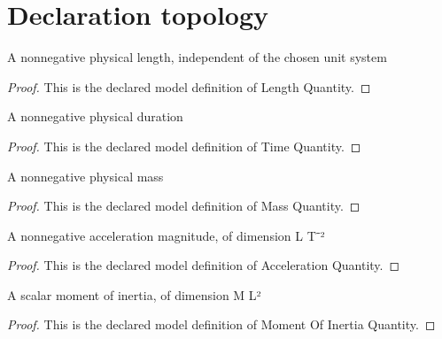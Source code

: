 \section{Declaration topology}
\begin{definition}
  \label{def:physics:phyx-mini-0282:phyxminiproblems-problemphyxmini0282-lengthquantity}
  A nonnegative physical length, independent of the chosen unit system
\end{definition}
\begin{proof}
  This is the declared model definition of Length Quantity.
\end{proof}
\begin{definition}
  \label{def:physics:phyx-mini-0282:phyxminiproblems-problemphyxmini0282-timequantity}
  A nonnegative physical duration
\end{definition}
\begin{proof}
  This is the declared model definition of Time Quantity.
\end{proof}
\begin{definition}
  \label{def:physics:phyx-mini-0282:phyxminiproblems-problemphyxmini0282-massquantity}
  A nonnegative physical mass
\end{definition}
\begin{proof}
  This is the declared model definition of Mass Quantity.
\end{proof}
\begin{definition}
  \label{def:physics:phyx-mini-0282:phyxminiproblems-problemphyxmini0282-accelerationquantity}
  A nonnegative acceleration magnitude, of dimension L T⁻²
\end{definition}
\begin{proof}
  This is the declared model definition of Acceleration Quantity.
\end{proof}
\begin{definition}
  \label{def:physics:phyx-mini-0282:phyxminiproblems-problemphyxmini0282-momentofinertiaquantity}
  A scalar moment of inertia, of dimension M L²
\end{definition}
\begin{proof}
  This is the declared model definition of Moment Of Inertia Quantity.
\end{proof}
